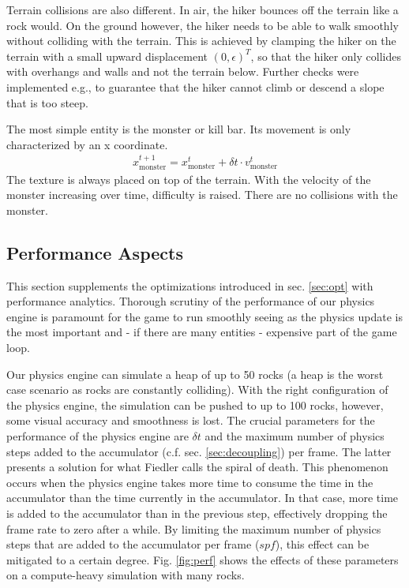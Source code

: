 Terrain collisions are also different.
In air, the hiker bounces off the terrain like a rock would.
On the ground however, the hiker needs to be able to walk smoothly without colliding with the terrain.
This is achieved by clamping the hiker on the terrain with a small upward displacement $(0, \epsilon)^T$, so that the hiker only collides with overhangs and walls and not the terrain below.
Further checks were implemented e.g., to guarantee that the hiker cannot climb or descend a slope that is too steep.

The most simple entity is the monster or kill bar.
Its movement is only characterized by an x coordinate.
\begin{align}
  x_{\text{monster}}^{t+1} = x_{\text{monster}}^{t} + \delta t \cdot v_{\text{monster}}^{t}
\end{align}
The texture is always placed on top of the terrain.
With the velocity of the monster increasing over time, difficulty is raised.
There are no collisions with the monster.

\subsection{Performance Aspects}\label{sec:performance}

This section supplements the optimizations introduced in sec. \ref{sec:opt} with performance analytics.
Thorough scrutiny of the performance of our physics engine is paramount for the game to run smoothly seeing as the physics update is the most important and - if there are many entities - expensive part of the game loop.

Our physics engine can simulate a heap of up to 50 rocks (a heap is the worst case scenario as rocks are constantly colliding).
With the right configuration of the physics engine, the simulation can be pushed to up to 100 rocks, however, some visual accuracy and smoothness is lost.
The crucial parameters for the performance of the physics engine are $\delta t$ and the maximum number of physics steps added to the accumulator (c.f. sec. \ref{sec:decoupling}) per frame.
The latter presents a solution for what Fiedler \cite{gafferTimestep} calls the \glqq spiral of death\grqq{}.
This phenomenon occurs when the physics engine takes more time to consume the time in the accumulator than the time currently in the accumulator.
In that case, more time is added to the accumulator than in the previous step, effectively dropping the frame rate to zero after a while.
By limiting the maximum number of physics steps that are added to the accumulator per frame ($spf$), this effect can be mitigated to a certain degree.
Fig. \ref{fig:perf} shows the effects of these parameters on a compute-heavy simulation with many rocks.

